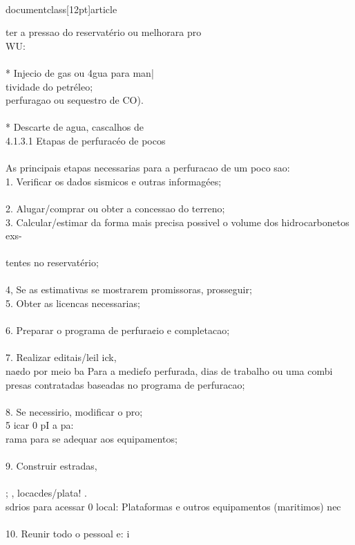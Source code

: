 \\documentclass[12pt]{article}
\begin{document}
{ter a pressao do reservatério ou melhorara pro\\
WU:\\
\\
* Injecio de gas ou 4gua para man|\\
tividade do petréleo;\\
perfuragao ou sequestro de CO).\\
\\
* Descarte de agua, cascalhos de\\
4.1.3.1 Etapas de perfuracéo de pocos\\
\\
As principais etapas necessarias para a perfuracao de um poco sao:\\
1. Verificar os dados sismicos e outras informagées;\\
\\
2. Alugar/comprar ou obter a concessao do terreno;\\
3. Calcular/estimar da forma mais precisa possivel o volume dos hidrocarbonetos exs-\\
\\
tentes no reservatério;\\
\\
4, Se as estimativas se mostrarem promissoras, prosseguir;\\
5. Obter as licencas necessarias;\\
\\
6. Preparar o programa de perfura¢io e completacao;\\
\\
7. Realizar editais/leil ick,\\
na¢do por meio ba Para a medi¢fo perfurada, dias de trabalho ou uma combi\\
presas contratadas baseadas no programa de perfuracao;\\
\\
8. Se necessirio, modificar o pro;\\
5 icar 0 pI a pa:\\
rama para se adequar aos equipamentos;\\
\\
9. Construir estradas, \\}\\
; , locacdes/plata! .\\
sdrios para acessar 0 local: Plataformas e outros equipamentos (maritimos) nec\\
\\
10. Reunir todo o pessoal e: i\\
\end{document}
